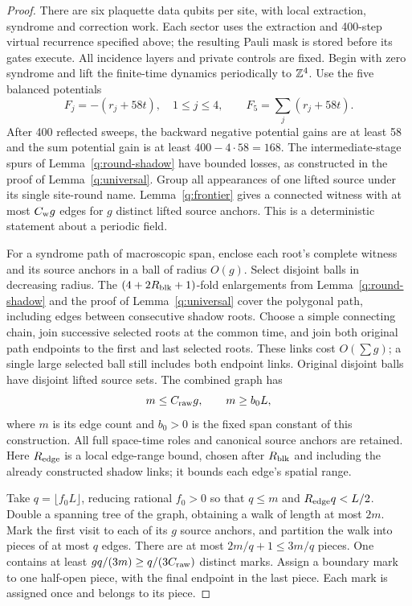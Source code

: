 \begin{proof}
There are six plaquette data qubits per site, with local extraction,
syndrome and correction work. Each sector uses the extraction and
400-step virtual recurrence specified above; the resulting Pauli mask is
stored before its gates execute. All
incidence layers and private controls are fixed. Begin with zero
syndrome and lift the finite-time dynamics periodically to \(\mathbb Z^4\).
Use the five balanced potentials
\[
 F_j=-(r_j+58t),\quad 1\le j\le4,\qquad
 F_5=\sum_j(r_j+58t).
\]
After 400 reflected sweeps, the backward negative potential gains are at
least 58 and the sum potential gain is at least \(400-4\cdot58=168\).
The intermediate-stage spurs of Lemma~\ref{q:round-shadow} have bounded losses, as constructed in the proof of Lemma~\ref{q:universal}. Group all
appearances of one lifted source under its single site-round name.
Lemma~\ref{q:frontier} gives a connected witness with at most
\(C_{\rm w}g\) edges for \(g\) distinct lifted source anchors.
This is a deterministic statement about a periodic field.

For a syndrome path of macroscopic span, enclose each root's complete
witness and its source anchors in a ball of radius \(O(g)\). Select
disjoint balls in decreasing radius. The
\((4+2R_{\rm blk}+1)\)-fold enlargements from
Lemma~\ref{q:round-shadow} and the proof of Lemma~\ref{q:universal}
cover the polygonal path, including edges between consecutive shadow roots. Choose a
simple connecting chain, join successive selected roots at the common
time, and join both original path endpoints to the first and last
selected roots. These links cost \(O(\sum g)\); a single large
selected ball still includes both endpoint links. Original disjoint
balls have disjoint lifted source sets. The combined graph has
\begin{equation}\label{x:raw-span}
 m\le C_{\rm raw}g,\qquad m\ge b_0L,
\end{equation}
where \(m\) is its edge count and \(b_0>0\) is the fixed span constant of this construction. All full space-time roles and canonical
source anchors are retained. Here \(R_{\rm edge}\) is a local edge-range
bound, chosen after \(R_{\rm blk}\) and including the already
constructed shadow links; it bounds each edge's spatial range.

Take \(q=\lfloor f_0L\rfloor\), reducing rational
\(f_0>0\) so that \(q\le m\) and \(R_{\rm edge}q<L/2\).
Double a spanning tree of the graph, obtaining a walk of length at
most \(2m\). Mark the first visit to each of its \(g\) source
anchors, and partition the walk into pieces of at most \(q\) edges.
There are at most \(2m/q+1\le3m/q\) pieces. One contains at least
\(gq/(3m)\ge q/(3C_{\rm raw})\) distinct marks. Assign a boundary
mark to one half-open piece, with the final endpoint in the last
piece. Each mark is assigned once and belongs to its piece.


\end{proof}
